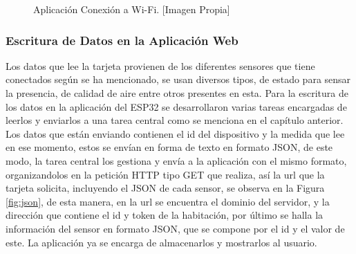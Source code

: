 \begin{figure}[H]
	\centering
	\caption[Aplicación Conexión a Wi-Fi.]{Aplicación Conexión a Wi-Fi. [Imagen Propia]}
	\label{fig:wifi}
\end{figure}

\subsubsection{Escritura de Datos en la Aplicación Web}

Los datos que lee la tarjeta provienen de los diferentes sensores que tiene conectados según se ha mencionado, se usan diversos tipos, de estado para sensar la presencia, de calidad de aire entre otros presentes en esta. Para la escritura de los datos en la aplicación del ESP32 se desarrollaron varias tareas encargadas de leerlos y enviarlos a una tarea central como se menciona en el capítulo anterior. Los datos que están enviando contienen el id del dispositivo y la medida que lee en ese momento, estos se envían en forma de texto en formato JSON, de este modo, la tarea central los gestiona y envía a la aplicación con el mismo formato, organizandolos en la petición HTTP tipo GET que realiza, así la url que la tarjeta solicita, incluyendo el JSON de cada sensor, se observa en la Figura \ref{fig:json}, de esta manera, en la url se encuentra el dominio del servidor, y la dirección que contiene el id y token de la habitación, por último se halla la información del sensor en formato JSON, que se compone por el id y el valor de este. La aplicación ya se encarga de almacenarlos y mostrarlos al usuario.\\

